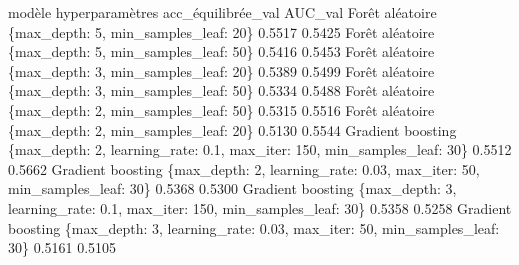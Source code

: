 \documentclass[
  10pt,
]{article}
\newenvironment{Shaded}{}{}
\newcommand{\NormalTok}[1]{#1}
\begin{document}
\begin{Shaded}
\begin{Highlighting}[]
\NormalTok{               modèle                                                                  hyperparamètres  acc\_équilibrée\_val  AUC\_val}
\NormalTok{      Forêt aléatoire                                         \{\textquotesingle{}max\_depth\textquotesingle{}: 5, \textquotesingle{}min\_samples\_leaf\textquotesingle{}: 20\}              0.5517   0.5425}
\NormalTok{      Forêt aléatoire                                         \{\textquotesingle{}max\_depth\textquotesingle{}: 5, \textquotesingle{}min\_samples\_leaf\textquotesingle{}: 50\}              0.5416   0.5453}
\NormalTok{      Forêt aléatoire                                         \{\textquotesingle{}max\_depth\textquotesingle{}: 3, \textquotesingle{}min\_samples\_leaf\textquotesingle{}: 20\}              0.5389   0.5499}
\NormalTok{      Forêt aléatoire                                         \{\textquotesingle{}max\_depth\textquotesingle{}: 3, \textquotesingle{}min\_samples\_leaf\textquotesingle{}: 50\}              0.5334   0.5488}
\NormalTok{      Forêt aléatoire                                         \{\textquotesingle{}max\_depth\textquotesingle{}: 2, \textquotesingle{}min\_samples\_leaf\textquotesingle{}: 50\}              0.5315   0.5516}
\NormalTok{      Forêt aléatoire                                         \{\textquotesingle{}max\_depth\textquotesingle{}: 2, \textquotesingle{}min\_samples\_leaf\textquotesingle{}: 20\}              0.5130   0.5544}
\NormalTok{    Gradient boosting  \{\textquotesingle{}max\_depth\textquotesingle{}: 2, \textquotesingle{}learning\_rate\textquotesingle{}: 0.1, \textquotesingle{}max\_iter\textquotesingle{}: 150, \textquotesingle{}min\_samples\_leaf\textquotesingle{}: 30\}              0.5512   0.5662}
\NormalTok{    Gradient boosting  \{\textquotesingle{}max\_depth\textquotesingle{}: 2, \textquotesingle{}learning\_rate\textquotesingle{}: 0.03, \textquotesingle{}max\_iter\textquotesingle{}: 50, \textquotesingle{}min\_samples\_leaf\textquotesingle{}: 30\}              0.5368   0.5300}
\NormalTok{    Gradient boosting  \{\textquotesingle{}max\_depth\textquotesingle{}: 3, \textquotesingle{}learning\_rate\textquotesingle{}: 0.1, \textquotesingle{}max\_iter\textquotesingle{}: 150, \textquotesingle{}min\_samples\_leaf\textquotesingle{}: 30\}              0.5358   0.5258}
\NormalTok{    Gradient boosting  \{\textquotesingle{}max\_depth\textquotesingle{}: 3, \textquotesingle{}learning\_rate\textquotesingle{}: 0.03, \textquotesingle{}max\_iter\textquotesingle{}: 50, \textquotesingle{}min\_samples\_leaf\textquotesingle{}: 30\}              0.5161   0.5105}

\end{Highlighting}
\end{Shaded}
\end{document}
